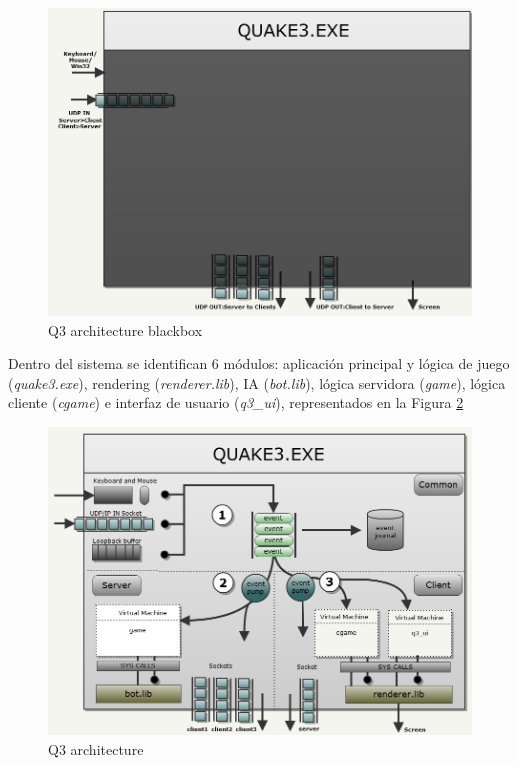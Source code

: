\documentclass[a4paper,12pt]{report}
\begin{document}
	
	\begin{center}
		\begin{figure}[h]
			\includegraphics[width=1\textwidth]{images/q3_architecture_blackbox}
			\caption{Q3 architecture blackbox}
			\label{figarchitectureblackbox}
		\end{figure}
	\end{center}
 
 \newpage
	Dentro del sistema se identifican 6 módulos: aplicación principal y lógica de juego (\textit{quake3.exe}), rendering (\textit{renderer.lib}), IA (\textit{bot.lib}), lógica servidora (\textit{game}), lógica cliente (\textit{cgame}) e interfaz de usuario (\textit{q3\_ui}), representados en la Figura \ref{figarchitecture}

		\begin{center}
			\begin{figure}[h]
				\includegraphics[width=1\textwidth]{images/q3_architecture}
				\caption{Q3 architecture}
				\label{figarchitecture}
			\end{figure}
		\end{center}
	
\end{document}
